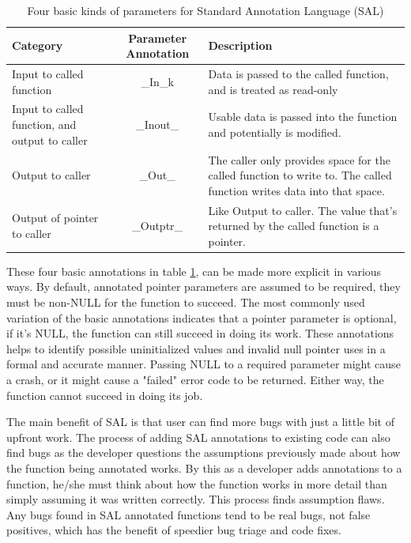 \begin{table}
	\centering
	\begin{tabular}{|l|c|p{5cm}|}
		\hline
		\textbf{Category} & \textbf{Parameter Annotation} & \textbf{Description}  \\
		\hline
		
		Input to called function        & \_In\_k  		   & Data is passed to the called function, and 
		is treated as read-only\\
		\hline
		
		Input to called function, and output to caller        & \_Inout\_ & Usable data is passed into the function 
		and potentially is modified. \\ \hline
		Output to caller        & \_Out\_ & The caller only provides space 
		for the called function to write to. 
		The called function writes
		data into that space. \\
		\hline
		
		Output of pointer to caller         & \_Outptr\_  & Like Output to caller. The value that's returned by the called function is a pointer.\\ 	\hline
			
	\end{tabular}
	\vspace{1em}
	\caption{Four basic kinds of parameters for Standard Annotation Language (SAL)}
	\label{table:four basic kinds of parameters}
\end{table}

These four basic annotations in table \ref{table:four basic kinds of parameters}, can be made more explicit in various ways. By default, annotated pointer parameters are assumed to be required, they must be non-NULL for the function to succeed. The most commonly used variation of the basic annotations indicates that a pointer parameter is optional, if it's NULL, the function can still succeed in doing its work. These annotations helps to identify possible uninitialized values and invalid null pointer uses in a formal and accurate manner. Passing NULL to a required parameter might cause a crash, or it might cause a "failed" error code to be returned. Either way, the function cannot succeed in doing its job.

The main benefit of SAL is that user can find more bugs with just a little bit of upfront work. The process of adding SAL annotations to existing code can also find bugs as the developer questions the assumptions previously made about how the function being annotated works. By this as a developer adds annotations to a function, he/she must think about how the function works in more detail than simply assuming it was written correctly. This process finds assumption flaws. Any bugs found in SAL annotated functions tend to be real bugs, not false positives, which has the benefit of speedier bug triage and code fixes.

